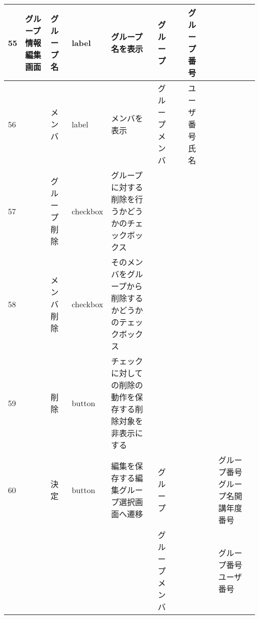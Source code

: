 \begin{landscape}
\newpage
\begin{table}[]
\centering
\begin{tabular}{|l|l|l|l|l|l|l|l|l|l|l|}
\hline
55  & グループ情報編集画面    & グループ名            & label    & グループ名を表示                                                          & グループ    &                       & グループ番号             &                 &                               &                                                                \\ \hline
56  &               & メンバ              & label    & メンバを表示                                                            & グループメンバ &                       & ユーザ番号氏名            &                 &                               &                                                                \\ \hline
57  &               & グループ削除           & checkbox & グループに対する削除を行うかどうかのチェックボックス                                        &         &                       &                    &                 &                               &                                                                \\ \hline
58  &               & メンバ削除            & checkbox & そのメンバをグループから削除するかどうかのテェックボックス                                     &         &                       &                    &                 &                               &                                                                \\ \hline
59  &               & 削除               & button   & チェックに対しての削除の動作を保存する削除対象を非表示にする                                    &         &                       &                    &                 &                               &                                                                \\ \hline
60  &               & 決定               & button   & 編集を保存する編集グループ選択画面へ遷移                                              & グループ    &                       &                    &                 & グループ番号グループ名開講年度番号             &                                                                \\ \hline
    &               &                  &          &                                                                   & グループメンバ &                       &                    &                 & グループ番号ユーザ番号                   &                                                                \\ \hline

\end{tabular}
\end{table}
\end{landscape}

